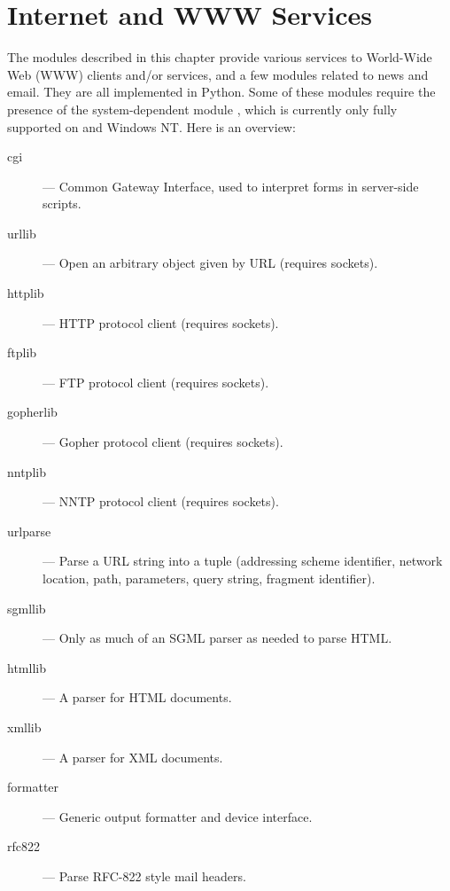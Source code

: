 \chapter{Internet and WWW Services}

The modules described in this chapter provide various services to
World-Wide Web (WWW) clients and/or services, and a few modules
related to news and email.  They are all implemented in Python.  Some
of these modules require the presence of the system-dependent module
, which is currently only fully
supported on \UNIX{} and Windows NT.  Here is an overview:

\begin{description}

\item[cgi]
--- Common Gateway Interface, used to interpret forms in server-side
scripts.

\item[urllib]
--- Open an arbitrary object given by URL (requires sockets).

\item[httplib]
--- HTTP protocol client (requires sockets).

\item[ftplib]
--- FTP protocol client (requires sockets).

\item[gopherlib]
--- Gopher protocol client (requires sockets).

\item[nntplib]
--- NNTP protocol client (requires sockets).

\item[urlparse]
--- Parse a URL string into a tuple (addressing scheme identifier, network
location, path, parameters, query string, fragment identifier).

\item[sgmllib]
--- Only as much of an SGML parser as needed to parse HTML.

\item[htmllib]
--- A parser for HTML documents.

\item[xmllib]
--- A parser for XML documents.

\item[formatter]
--- Generic output formatter and device interface.

\item[rfc822]
--- Parse RFC-822 style mail headers.


\end{description}
